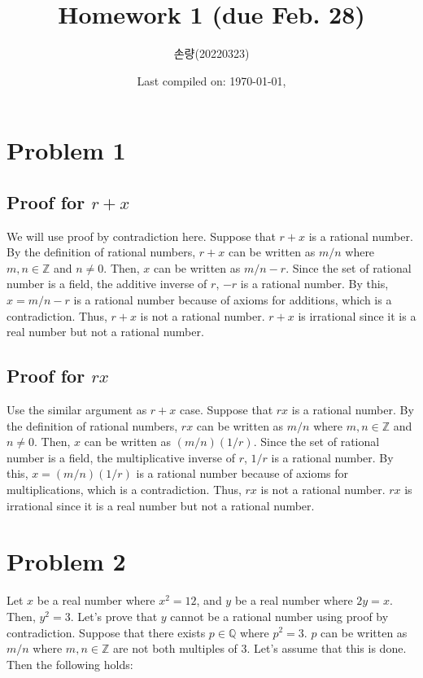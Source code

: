 \documentclass{scrartcl}
\title{Homework 1 (due Feb. 28)}
\author{손량(20220323)}
\date{Last compiled on: \today, \currenttime}
\begin{document}
\maketitle

\section{Problem 1}
\subsection{Proof for \(r + x\)}
We will use proof by contradiction here. Suppose that \(r + x\) is a rational number. By the definition of rational numbers, \(r + x\) can be written as \(m / n\) where \(m, n \in \mathbb{Z}\) and \(n \not= 0\). Then, \(x\) can be written as \(m / n - r\). Since the set of rational number is a field, the additive inverse of \(r\), \(-r\) is a rational number. By this, \(x = m / n - r\) is a rational number because of axioms for additions, which is a contradiction. Thus, \(r + x\) is not a rational number. \(r + x\) is irrational since it is a real number but not a rational number.

\subsection{Proof for \(rx\)}
Use the similar argument as \(r + x\) case. Suppose that \(rx\) is a rational number. By the definition of rational numbers, \(rx\) can be written as \(m / n\) where \(m, n \in \mathbb{Z}\) and \(n \not= 0\). Then, \(x\) can be written as \((m / n)(1 / r)\). Since the set of rational number is a field, the multiplicative inverse of \(r\), \(1 / r\) is a rational number. By this, \(x = (m / n)(1 / r)\) is a rational number because of axioms for multiplications, which is a contradiction. Thus, \(rx\) is not a rational number. \(rx\) is irrational since it is a real number but not a rational number.

\section{Problem 2}
Let \(x\) be a real number where \(x^2 = 12\), and \(y\) be a real number where \(2y = x\). Then, \(y^2 = 3\). Let's prove that \(y\) cannot be a rational number using proof by contradiction. Suppose that there exists \(p \in \mathbb{Q}\) where \(p^2 = 3\). \(p\) can be written as \(m / n\) where \(m, n \in \mathbb{Z}\) are not both multiples of 3. Let's assume that this is done. Then the following holds:
\end{document}
